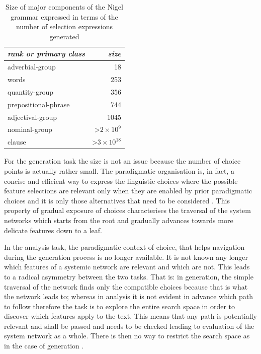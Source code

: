 \begin{table}[!ht]
    \centering
    \begin{tabular}{|l|r|}
        \hline
        \textit{rank or primary class} & \textit{size}                             \\ \hline
        adverbial-group                & 18                                        \\ \hline
        words                          & 253                                       \\ \hline
        quantity-group                 & 356                                       \\ \hline
        prepositional-phrase           & 744                                       \\ \hline
        adjectival-group               & 1045                                      \\ \hline
        nominal-group                  & \textgreater $ 2\times 10^{9} $  \\ \hline
        clause                         & \textgreater $ 3\times 10^{18} $ \\ \hline
    \end{tabular}
    \caption{Size of major components of the Nigel grammar expressed in terms of the number of selection expressions generated \citep[35]{Bateman2008}}
    \label{tab:size}
\end{table}

For the generation task the size is not an issue because the number of choice points is actually rather small. The paradigmatic organisation is, in fact, a concise and efficient way to express the linguistic choices where the possible feature selections are relevant only when they are enabled by prior paradigmatic choices and it is only those alternatives that need to be considered \citep[12--13]{Halliday96-grammatics}. This property of gradual exposure of choices characterises the traversal of the system networks which starts from the root and gradually advances towards more delicate features down to a leaf.

In the analysis task, the paradigmatic context of choice, that helps navigation during the generation process is no longer available. It is not known
any longer which features of a systemic network are relevant and which are not. This leads to a radical asymmetry between the two tasks. That
is: in generation, the simple traversal of the network finds only the compatible choices
because that is what the network leads to; whereas in analysis it is not evident in
advance which path to follow therefore the task is to explore the entire search
space in order to discover which features apply to the text. This means that any path is potentially relevant and shall be passed and needs to be checked leading to evaluation of the system network as a whole. There is then no way to restrict the search space as in the case of generation \citep[29]{Bateman2008}. 


